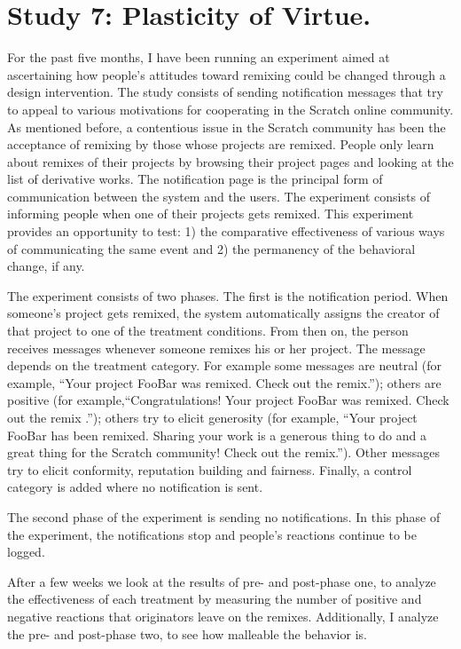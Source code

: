 

\section{Study 7: Plasticity of Virtue.}
For the past five months, I have been running an experiment aimed at ascertaining how people's attitudes toward remixing could be changed through a design intervention.
The study consists of sending notification messages that try to appeal to various motivations for cooperating in the Scratch online community. 
As mentioned before, a contentious issue in the Scratch community has been the acceptance of remixing by those whose projects are remixed. 
People only learn about remixes of their projects by browsing their project pages and looking at the list of derivative works. 
The notification page is the principal form of communication between the system and the users.
The experiment consists of informing people when one of their projects gets remixed.
This experiment provides an opportunity to test: 1) the comparative effectiveness of various ways of communicating the same event and 2) the permanency of the behavioral change, if any. 

The experiment consists of two phases.
The first is the notification period. 
When someone's project gets remixed, the system automatically assigns the creator of that project to one of the treatment conditions. 
From then on, the person receives messages whenever someone remixes his or her project. The message depends on the treatment category.
For example some messages are neutral (for example, ``Your project FooBar was remixed. Check out the remix.''); 
others are positive (for example,``Congratulations! Your project FooBar was remixed. Check out the remix .'');
others try to elicit generosity (for example, ``Your project FooBar has been remixed. Sharing your work is a generous thing to do and a great thing for the Scratch community! Check out the remix.'').
Other messages try to elicit conformity, reputation building and fairness.
Finally, a control category is added where no notification is sent.

The second phase of the experiment is sending no notifications. In this phase of the experiment, the notifications stop and people's reactions continue to be logged.

After a few weeks we look at the results of pre- and post-phase one, to analyze the effectiveness of each treatment by measuring the number of positive and negative reactions that originators leave on the remixes. 
Additionally, I analyze the pre- and post-phase two, to see how malleable the behavior is.

